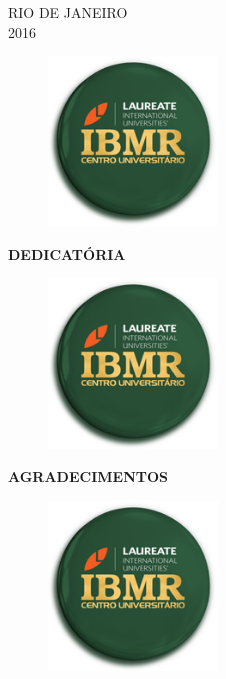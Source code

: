 \documentclass[12pt]{article} %
\begin{document}
\begin{center}
\MakeUppercase{Rio de Janeiro}\\
2016
\end{center}

\newpage

\begin{center}
\begin{figure}[h!]
\centering
\includegraphics[width=4.5cm]{ibmr.png}
\end{figure}
\MakeUppercase{\textbf{Dedicatória}}
\end{center}


\newpage

\begin{center}
\begin{figure}[h!]
\centering
\includegraphics[width=4.5cm]{ibmr.png}
\end{figure}
\MakeUppercase{\textbf{Agradecimentos}}
\end{center}


\newpage
\begin{figure}[h!]
\centering
\includegraphics[width=4.5cm]{ibmr.png}
\end{figure}
 \selectfont
\end{document}
